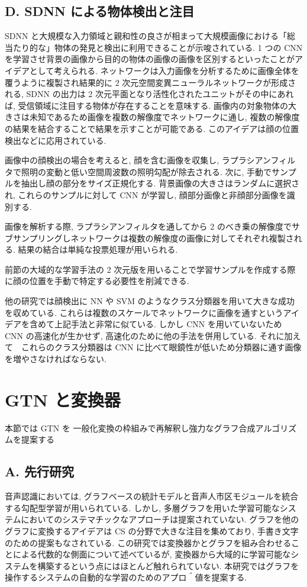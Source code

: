 \documentclass[twocolumn]{jarticle}     %
\begin{document}
\subsection*{D. SDNN による物体検出と注目}
SDNN と大規模な入力領域と親和性の良さが相まって大規模画像における「総当たり的な」物体の発見と検出に利用できることが示唆されている.
1 つの CNN を学習させ背景の画像から目的の物体の画像の画像を区別するといったことがアイデアとして考えられる. 
ネットワークは入力画像を分析するために画像全体を覆うように複製され結果的に 2 次元空間変異ニューラルネットワークが形成される, SDNN の出力は 2 次元平面となり活性化されたユニットがその中にあれば, 受信領域に注目する物体が存在することを意味する. 画像内の対象物体の大きさは未知であるため画像を複数の解像度でネットワークに通し, 複数の解像度の結果を結合することで結果を示すことが可能である. このアイデアは顔の位置検出などに応用されている.\par
画像中の顔検出の場合を考えると, 顔を含む画像を収集し, ラプラシアンフィルタで照明の変動と低い空間周波数の照明勾配が除去される. 次に, 手動でサンプルを抽出し顔の部分をサイズ正規化する. 背景画像の大きさはランダムに選択され, これらのサンプルに対して CNN が学習し, 顔部分画像と非顔部分画像を識別する.\par
画像を解析する際, ラプラシアンフィルタを通してから 2 のべき乗の解像度でサブサンプリングしネットワークは複数の解像度の画像に対してそれぞれ複製される. 結果の結合は単純な投票処理が用いられる. 
\par
前節の大域的な学習手法の 2 次元版を用いることで学習サンプルを作成する際に顔の位置を手動で特定する必要性を削減できる.
\par
他の研究では顔検出に NN や SVM のようなクラス分類器を用いて大きな成功を収めている. これらは複数のスケールでネットワークに画像を通すというアイデアを含めて上記手法と非常に似ている. しかし CNN を用いていないため CNN の高速化が生かせず, 高速化のために他の手法を併用している. それに加えて　これらのクラス分類器は CNN に比べて眼鏡性が低いため分類器に通す画像を増やさなければならない. 

\section{GTN と変換器}
本節では GTN を 一般化変換の枠組みで再解釈し強力なグラフ合成アルゴリズムを提案する

\subsection*{A. 先行研究}
音声認識においては, グラフベースの統計モデルと音声人市区モジュールを統合する勾配型学習が用いられている.
しかし, 多層グラフを用いた学習可能なシステムにおいてのシステマチックなアプローチは提案されていない. 
グラフを他のグラフに変換するアイデアは CS の分野で大きな注目を集めており, 手書き文字のための提案もなされている. この研究では変換器かとグラフを組み合わせることによる代数的な側面について述べているが, 変換器から大域的に学習可能なシステムを構築するという点にはほとんど触れられていない. 
本研究ではグラフを操作するシステムの自動的な学習のためのアプロ＾値を提案する.
\end{document}
